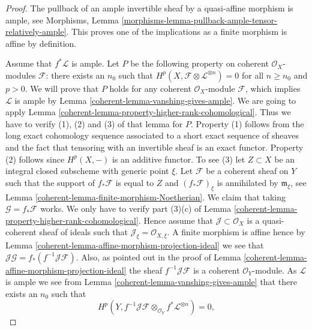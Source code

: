 \begin{proof}

The pullback of an ample invertible sheaf by a quasi-affine morphism
is ample, see Morphisms, Lemma
\ref{morphisms-lemma-pullback-ample-tensor-relatively-ample}.
This proves one of the implications as a finite morphism is affine
by definition.

\medskip\noindent
Assume that $f^*\mathcal{L}$ is ample. Let $P$ be the following property on
coherent $\mathcal{O}_X$-modules $\mathcal{F}$: there exists an $n_0$
such that $H^p(X, \mathcal{F} \otimes \mathcal{L}^{\otimes n}) = 0$
for all $n \geq n_0$ and $p > 0$. We will prove that $P$ holds
for any coherent $\mathcal{O}_X$-module $\mathcal{F}$, which implies
$\mathcal{L}$ is ample by Lemma \ref{coherent-lemma-vanshing-gives-ample}.
We are going to apply Lemma \ref{coherent-lemma-property-higher-rank-cohomological}.
Thus we have to verify (1), (2) and (3) of that lemma for $P$.
Property (1) follows from the long exact cohomology sequence associated
to a short exact sequence of sheaves and the fact that tensoring with
an invertible sheaf is an exact functor. Property (2) follows since
$H^p(X, -)$ is an additive functor. To see (3) let $Z \subset X$ be
an integral closed subscheme with generic point $\xi$.
Let $\mathcal{F}$ be a coherent sheaf on $Y$ such that
the support of $f_*\mathcal{F}$ is equal to $Z$
and $(f_*\mathcal{F})_\xi$ is annihilated by $\mathfrak m_\xi$,
see Lemma \ref{coherent-lemma-finite-morphism-Noetherian}. We claim that
taking $\mathcal{G} = f_*\mathcal{F}$ works. We only have to verify
part (3)(c) of Lemma \ref{coherent-lemma-property-higher-rank-cohomological}.
Hence assume that $\mathcal{J} \subset \mathcal{O}_X$ is a
quasi-coherent sheaf of ideals such that
$\mathcal{J}_\xi = \mathcal{O}_{X, \xi}$.
A finite morphism is affine hence by
Lemma \ref{coherent-lemma-affine-morphism-projection-ideal} we see that
$\mathcal{J}\mathcal{G} = f_*(f^{-1}\mathcal{J}\mathcal{F})$.
Also, as pointed out in the proof of
Lemma \ref{coherent-lemma-affine-morphism-projection-ideal} the sheaf
$f^{-1}\mathcal{J}\mathcal{F}$ is a coherent $\mathcal{O}_Y$-module.
As $\mathcal{L}$ is ample we see from Lemma \ref{coherent-lemma-vanshing-gives-ample}
that there exists an $n_0$ such that
$$
H^p(Y, f^{-1}\mathcal{J}\mathcal{F}
\otimes_{\mathcal{O}_Y} f^*\mathcal{L}^{\otimes n}) = 0,
$$
\end{proof}
